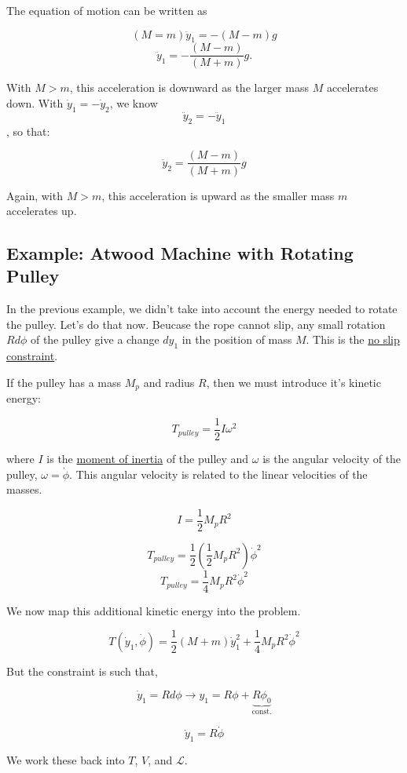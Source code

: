 \documentclass[11pt]{article}
\begin{document}
The equation of motion can be written as

\[(M=m)\ddot{y}_1 = -(M-m)g\] \[\ddot{y}_1 = -\dfrac{(M-m)}{(M+m)}g.\]

With \(M > m\), this acceleration is downward as the larger mass \(M\)
accelerates down. With \(\dot{y}_1 = -\dot{y}_2\), we know
\[\ddot{y}_2 = -\ddot{y}_1\], so that:

\[\ddot{y}_2 = \dfrac{(M-m)}{(M+m)}g\]

Again, with \(M > m\), this acceleration is upward as the smaller mass
\(m\) accelerates up.

\subsection{Example: Atwood Machine with Rotating
Pulley}\label{example-atwood-machine-with-rotating-pulley}

In the previous example, we didn't take into account the energy needed
to rotate the pulley. Let's do that now. Beucase the rope cannot slip,
any small rotation \(Rd\phi\) of the pulley give a change \(dy_1\) in
the position of mass \(M\). This is the
\href{https://en.wikipedia.org/wiki/No-slip_condition}{no slip
constraint}.

If the pulley has a mass \(M_p\) and radius \(R\), then we must
introduce it's kinetic energy:

\[T_{pulley} =  \dfrac{1}{2} I \omega^2\]

where \(I\) is the
\href{https://en.wikipedia.org/wiki/List_of_moments_of_inertia}{moment
of inertia} of the pulley and \(\omega\) is the angular velocity of the
pulley, \(\omega = \dot{\phi}\). This angular velocity is related to the
linear velocities of the masses.

\[I = \dfrac{1}{2}M_p R^2\]

\[T_{pulley} =  \dfrac{1}{2} \left(\dfrac{1}{2}M_p R^2\right) \dot{\phi}^2\]
\[T_{pulley} =  \dfrac{1}{4}M_p R^2 \dot{\phi}^2\]

We now map this additional kinetic energy into the problem.

\[T(\dot{y}_1, \dot{\phi}) = \dfrac{1}{2}(M+m)\dot{y}_1^2 + \dfrac{1}{4}M_p R^2 \dot{\phi}^2\]

But the constraint is such that,

\[\dot{y}_1 = Rd\phi \rightarrow y_1 = R\phi +\underbrace{R\phi_0}_{\textrm{const.}}\]

\[\dot{y}_1 = R\dot{\phi}\]

We work these back into \(T\), \(V\), and \(\mathcal{L}\).
\end{document}
